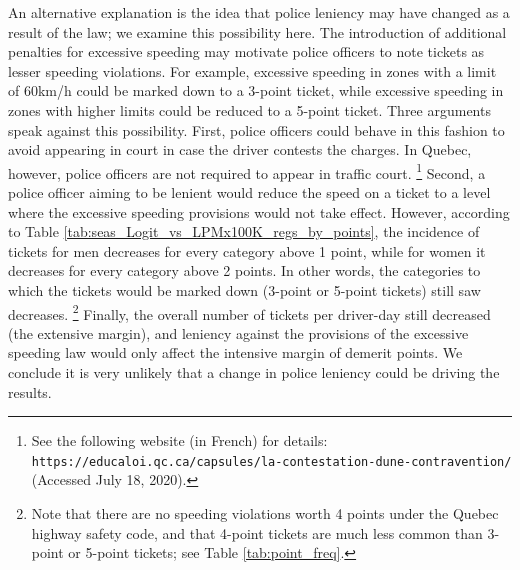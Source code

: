 An alternative explanation is the idea that police leniency may have changed as a result of the law; 
we examine this possibility here. 
The introduction of additional penalties for excessive speeding may 
motivate police officers to note tickets as lesser speeding violations. 
For example, excessive speeding in zones with a limit of 60km/h 
could be marked down to a 3-point ticket, 
while excessive speeding in zones with higher limits could be reduced to a 5-point ticket. 
Three arguments speak against this possibility. 
First, police officers could behave in this fashion to avoid appearing in court 
in case the driver contests the charges.  
In Quebec, however, police officers are not required to appear in traffic court.%
\footnote{%
See the following website (in French) for details: \texttt{https://educaloi.qc.ca/capsules/la-contestation-dune-contravention/} (Accessed July 18, 2020).}  
%
Second, a police officer aiming to be lenient would reduce the speed on a ticket 
to a level where the excessive speeding provisions would not take effect. 
% 
However, according to 
Table \ref{tab:seas_Logit_vs_LPMx100K_regs_by_points}, 
the incidence of tickets for men decreases for every category above 1 point, 
while for women it decreases for every category above 2 points. 
In other words, the categories to which the tickets would be marked down (3-point or 5-point tickets) still saw decreases.%
\footnote{%
Note that there are no speeding violations worth 4 points under the Quebec highway safety code, and that 4-point tickets are much less common than 3-point or 5-point tickets; see 
Table \ref{tab:point_freq}.
}
% 
Finally, the overall number of tickets per driver-day still decreased (the extensive margin), 
and leniency against the provisions of the excessive speeding law 
would only affect the intensive margin of demerit points. 
We conclude it is very unlikely that a change in police leniency could be driving the results.





